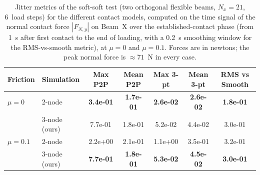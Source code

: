 \begin{table}[ht]
    \centering
    \small
    \caption{Jitter metrics of the soft-soft test (two orthogonal flexible beams, $N_x = 21$, 6~load steps) for the different contact models, computed on the time signal of the normal contact force $|F_{N,y}|$ on Beam~X over the established-contact phase (from 1~s after first contact to the end of loading, with a 0.2~s smoothing window for the RMS-vs-smooth metric), at $\mu = 0$ and $\mu = 0.1$. Forces are in newtons; the peak normal force is $\approx 71$~N in every case.}
    \label{tab:metrics_jitter_soft_soft}
    \begin{tabular}{llccccc}
        \toprule
        Friction & Simulation & Max P2P & Mean P2P & Max 3-pt & Mean 3-pt & RMS vs Smooth \\
        \midrule
        $\mu = 0$ & 2-node & \textbf{3.4e-01} & \textbf{1.7e-01} & \textbf{2.6e-02} & \textbf{2.6e-02} & \textbf{1.8e-01} \\
         & 3-node (ours) & 7.7e-01 & 1.8e-01 & 5.2e-02 & 4.4e-02 & 3.0e-01 \\
        \midrule
        $\mu = 0.1$ & 2-node & 2.2e+00 & 2.1e-01 & 1.1e+00 & 3.5e-01 & 3.2e-01 \\
         & 3-node (ours) & \textbf{7.7e-01} & \textbf{1.8e-01} & \textbf{5.3e-02} & \textbf{4.5e-02} & \textbf{3.0e-01} \\
        \bottomrule
    \end{tabular}
\end{table}

